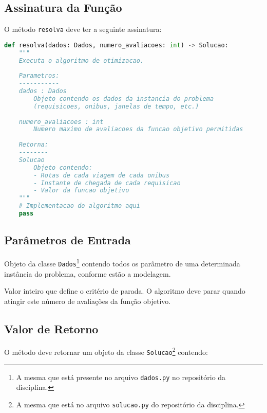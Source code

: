 \documentclass[12pt,a4paper]{article}
\begin{document}
\subsection{Assinatura da Função}

O método \texttt{resolva} deve ter a seguinte assinatura:

\begin{lstlisting}[language=Python]
def resolva(dados: Dados, numero_avaliacoes: int) -> Solucao:
    """
    Executa o algoritmo de otimizacao.
    
    Parametros:
    -----------
    dados : Dados
        Objeto contendo os dados da instancia do problema
        (requisicoes, onibus, janelas de tempo, etc.)
    
    numero_avaliacoes : int
        Numero maximo de avaliacoes da funcao objetivo permitidas
    
    Retorna:
    --------
    Solucao
        Objeto contendo:
        - Rotas de cada viagem de cada onibus
        - Instante de chegada de cada requisicao
        - Valor da funcao objetivo
    """
    # Implementacao do algoritmo aqui
    pass
\end{lstlisting}

\subsection{Parâmetros de Entrada}

\begin{description}[leftmargin=3cm,style=nextline]
    \item[\texttt{dados}] Objeto da classe \texttt{Dados}\footnote{A mesma que está presente no arquivo \texttt{dados.py} no repositório da disciplina.} contendo todos os parâmetro de uma determinada instância do problema, conforme estão a modelagem.
    \item[\texttt{numero\_avaliacoes}] Valor inteiro que define o critério de parada. O algoritmo deve parar quando atingir este número de avaliações da função objetivo.
\end{description}

\subsection{Valor de Retorno}

O método deve retornar um objeto da classe \texttt{Solucao}\footnote{A mesma que está no arquivo \texttt{solucao.py} do repositório da disciplina.} contendo:
\end{document}
